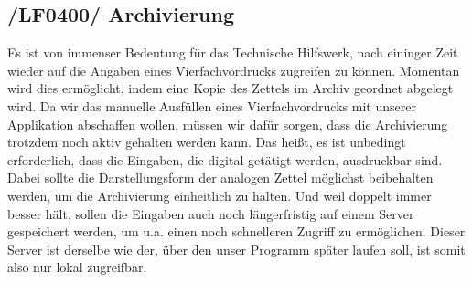 \subsection{/LF0400/ Archivierung}
Es ist von immenser Bedeutung für das Technische Hilfswerk, nach eininger Zeit wieder auf die Angaben eines Vierfachvordrucks
zugreifen zu können. Momentan wird dies ermöglicht, indem eine Kopie des Zettels im Archiv geordnet abgelegt wird. Da wir das manuelle Ausfüllen eines Vierfachvordrucks mit unserer Applikation abschaffen wollen, müssen wir dafür sorgen, dass die Archivierung trotzdem noch aktiv gehalten werden kann. Das heißt, es ist unbedingt erforderlich, dass die Eingaben, die digital getätigt werden, ausdruckbar sind. Dabei sollte die Darstellungsform der analogen Zettel möglichst beibehalten werden, um die Archivierung einheitlich zu halten. Und weil doppelt immer besser hält, sollen die Eingaben auch noch längerfristig auf einem Server gespeichert werden, um u.a. einen noch schnelleren Zugriff zu ermöglichen. Dieser Server ist derselbe wie der, über den unser Programm später laufen soll, ist somit also nur lokal zugreifbar.